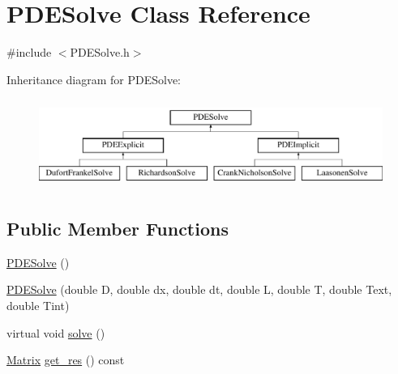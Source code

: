 \hypertarget{class_p_d_e_solve}{}\section{P\+D\+E\+Solve Class Reference}
\label{class_p_d_e_solve}


{\ttfamily \#include $<$P\+D\+E\+Solve.\+h$>$}

Inheritance diagram for P\+D\+E\+Solve\+:\begin{figure}[H]
\begin{center}
\leavevmode
\includegraphics[height=2.957747cm]{class_p_d_e_solve}
\end{center}
\end{figure}
\subsection*{Public Member Functions}
\begin{DoxyCompactItemize}
\item 
\hyperlink{class_p_d_e_solve_ae4ffb82f6502c303f1ffdb3831cc4f6d}{P\+D\+E\+Solve} ()
\item 
\hyperlink{class_p_d_e_solve_a1cfac8cfbb30ee0bd1c9100a5640f87f}{P\+D\+E\+Solve} (double D, double dx, double dt, double L, double T, double Text, double Tint)
\item 
virtual void \hyperlink{class_p_d_e_solve_a2fb309c3e7f35de2f639596f7fcb17cc}{solve} ()
\item 
\hyperlink{class_matrix}{Matrix} \hyperlink{class_p_d_e_solve_adece98ce0230132033efb28ecd629cb0}{get\+\_\+res} () const
\end{DoxyCompactItemize}
